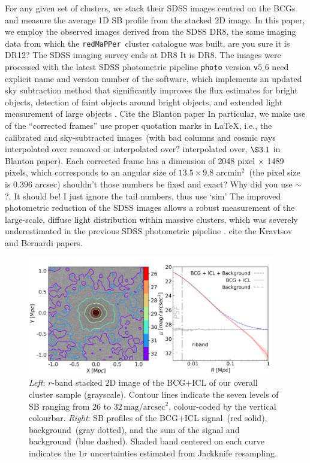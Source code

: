 \documentclass[fleqn,usenatbib]{mnras}
\newcommand{\sbmag}{\mathrm{mag}/\mathrm{arcsec}^{2}}
\newcommand\ying[1]{{\color{red} {#1}}}
\newcommand\xkchen[1]{{\color{cyan} {#1}}}
\newcommand\redmapper{\texttt{redMaPPer}}
\begin{document}
For any given set of clusters, we stack their SDSS images centred on the
BCGs and measure the average 1D SB profile from the stacked 2D image. In
this paper, we employ the observed images derived from the SDSS DR8, the
same imaging data from which the \redmapper~cluster catalogue was built.
\ying{are you sure it is DR12? The SDSS imaging survey ends at DR8} \xkchen{It is DR8.} The
images were processed with the latest SDSS photometric pipeline \xkchen{\rm{\tt{photo}}} version\xkchen{ \rm{\tt{v$5\_6$}}} \ying{need explicit name and version number of the software},
which implements an updated sky subtraction method that significantly
improves the flux estimates for bright objects, detection of faint objects
around bright objects, and extended light measurement of large objects\xkchen{\citep{Blanton2011} }.
\ying{Cite the Blanton paper} In particular, we make use of the ``corrected
frames''\ying{use proper quotation marks in LaTeX}, i.e., the calibrated
and sky-subtracted images~(with bad columns and cosmic rays interpolated
over\ying{removed or interpolated over?} \xkchen{interpolated over, $\S3.1$ in Blanton paper}). Each corrected frame has a
dimension of \xkchen{2048} pixel ${\times}$ \xkchen{1489} pixels, which corresponds to an
angular size of $13.5{\times}9.8$ arcmin$^{2}$~(the pixel size is \xkchen{$0.396$}
arcsec)\ying{shouldn't those numbers be fixed and exact? Why did you use
$\sim$?}.\xkchen{It should be! I just ignore the tail numbers, thus use `sim'} The improved photometric reduction of the SDSS images allows a
robust measurement of the large-scale, diffuse light distribution within
massive clusters, which was severely underestimated in the previous SDSS
photometric pipeline \xkchen{\citep{Bernardi2013, Kravtsov2018} }. \ying{cite the Kravtsov and Bernardi papers.}

\begin{figure}
    \centering\includegraphics[width=0.96\textwidth]{fig/mass-bin_r-band_BG-sub_2D.pdf}
    \caption{{\it Left}: $r$-band stacked $2$D image of the BCG+ICL of our
    overall cluster sample (grayscale). Contour lines indicate the seven
    levels of SB ranging from $26$ to $32\,\sbmag$, colour-coded by the
    vertical colourbar.  \textit{Right}: SB profiles of the BCG+ICL
    signal~(red solid), background~(gray dotted), and the sum of the signal
    and background~(blue dashed). Shaded band centered on each curve
    indicates the $1\sigma$ uncertainties estimated from Jackknife
    resampling. \label{fig:2D_all} }
\end{figure}
\end{document}
